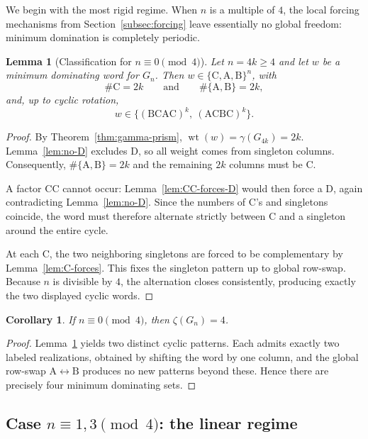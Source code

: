 \documentclass[11pt]{article}
\theoremstyle{plain}
\newtheorem{lemma}[theorem]{Lemma}
\newtheorem{corollary}[theorem]{Corollary}
\theoremstyle{definition}
\theoremstyle{remark}
\DeclareMathOperator{\wt}{wt}
\newcommand{\colA}{\mathrm{A}}
\newcommand{\colB}{\mathrm{B}}
\newcommand{\colC}{\mathrm{C}}
\newcommand{\colD}{\mathrm{D}}
\begin{document}
We begin with the most rigid regime.  When $n$ is a multiple of $4$, the local forcing
mechanisms from Section~\ref{subsec:forcing} leave essentially no global freedom:
minimum domination is completely periodic.

\begin{lemma}[Classification for $n\equiv 0\pmod4$]\label{lem:class-mod0}
Let $n=4k\ge4$ and let $w$ be a minimum dominating word for $G_n$.
Then $w\in\{\colC,\colA,\colB\}^n$, with
\[
\#\colC=2k
\qquad\text{and}\qquad
\#\{\colA,\colB\}=2k,
\]
and, up to cyclic rotation,
\[
w\in\bigl\{(\colB\colC\colA\colC)^k,\ (\colA\colC\colB\colC)^k\bigr\}.
\]
\end{lemma}

\begin{proof}
By Theorem~\ref{thm:gamma-prism}, $\wt(w)=\gamma(G_{4k})=2k$.
Lemma~\ref{lem:no-D} excludes $\colD$, so all weight comes from singleton columns.
Consequently, $\#\{\colA,\colB\}=2k$ and the remaining $2k$ columns must be $\colC$.

A factor $\colC\colC$ cannot occur: Lemma~\ref{lem:CC-forces-D} would then force a
$\colD$, again contradicting Lemma~\ref{lem:no-D}.
Since the numbers of $\colC$'s and singletons coincide, the word must therefore
alternate strictly between $\colC$ and a singleton around the entire cycle.

At each $\colC$, the two neighboring singletons are forced to be complementary by
Lemma~\ref{lem:C-forces}. This fixes the singleton pattern up to global row-swap.
Because $n$ is divisible by $4$, the alternation closes consistently, producing
exactly the two displayed cyclic words.
\end{proof}

\begin{corollary}\label{cor:count-mod0}
If $n\equiv 0\pmod4$, then $\zeta(G_n)=4$.
\end{corollary}

\begin{proof}
Lemma~\ref{lem:class-mod0} yields two distinct cyclic patterns.
Each admits exactly two labeled realizations, obtained by shifting the word by one
column, and the global row-swap $\colA\leftrightarrow\colB$ produces no new patterns
beyond these. Hence there are precisely four minimum dominating sets.
\end{proof}

\subsection{Case $n\equiv 1,3\pmod4$: the linear regime}\label{subsec:odd}
\end{document}

